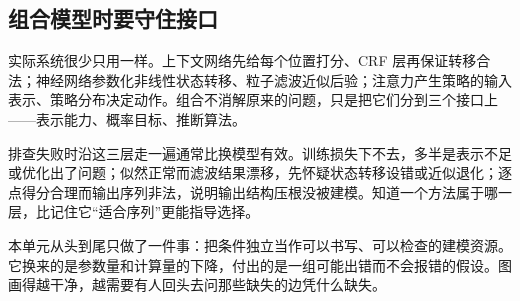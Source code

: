 \subsection{组合模型时要守住接口}

实际系统很少只用一样。上下文网络先给每个位置打分、CRF 层再保证转移合法；神经网络参数化非线性状态转移、粒子滤波近似后验；注意力产生策略的输入表示、策略分布决定动作。组合不消解原来的问题，只是把它们分到三个接口上——表示能力、概率目标、推断算法。

排查失败时沿这三层走一遍通常比换模型有效。训练损失下不去，多半是表示不足或优化出了问题；似然正常而滤波结果漂移，先怀疑状态转移设错或近似退化；逐点得分合理而输出序列非法，说明输出结构压根没被建模。知道一个方法属于哪一层，比记住它``适合序列''更能指导选择。

本单元从头到尾只做了一件事：把条件独立当作可以书写、可以检查的建模资源。它换来的是参数量和计算量的下降，付出的是一组可能出错而不会报错的假设。图画得越干净，越需要有人回头去问那些缺失的边凭什么缺失。

